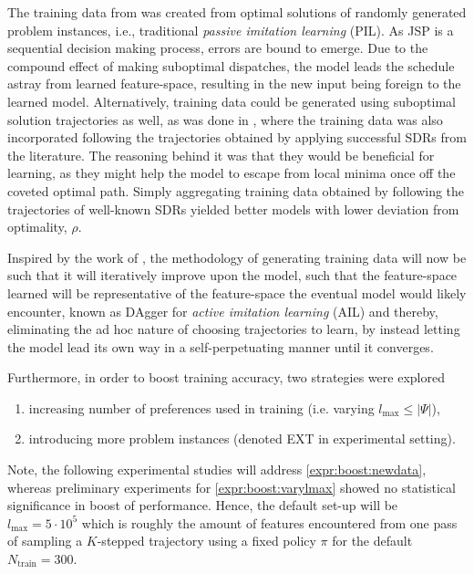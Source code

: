\documentclass[twocolumn]{svjour3}
\newcommand{\abs}[1]{\lvert#1\rvert}
\newcommand{\namerho}{deviation from optimality, $\rho$}
\begin{document}
The training data from \cite{InRu11a} was created from optimal solutions of 
randomly generated problem instances, i.e., traditional \emph{passive
imitation learning} (PIL). 
As JSP is a sequential decision making process, errors are bound to emerge. 
Due to the compound effect of making suboptimal dispatches, the model leads the 
schedule astray from learned feature-space, resulting in the new input being 
foreign to the learned model. 
Alternatively, training data could be generated using suboptimal solution 
trajectories as well, as was done in \cite{InRu15a}, where the training data 
was also incorporated following the trajectories obtained by applying 
successful SDRs from the literature. 
The reasoning behind it was that they would be beneficial for learning, 
as they might help the model to escape from local minima once off the coveted 
optimal path. 
Simply aggregating training data obtained by following the trajectories of 
well-known SDRs yielded better models with lower \namerho. 

Inspired by the work of \cite{RossB10,RossGB11}, the methodology of generating 
training data will now be such that it will iteratively improve upon the model, 
such that the feature-space learned will be representative of the feature-space 
the eventual model would likely encounter, known as DAgger for \emph{active 
imitation learning} (AIL) and thereby, eliminating the ad hoc nature of 
choosing trajectories to learn, by instead letting the model lead its own way 
in a self-perpetuating manner until it converges.

Furthermore, in order to boost training accuracy, two strategies were explored 
\begin{enumerate}[after={{}}, leftmargin=*,
label={\textbf{Boost.\arabic*}}, ref={{Boost.\arabic*}}]
\item \label{expr:boost:varylmax} increasing number of preferences used 
in training (i.e. varying \mbox{$l_{\max} \leq \abs{\Psi}$}),
\item \label{expr:boost:newdata} introducing more problem instances (denoted 
EXT in experimental setting).
\end{enumerate}
Note, the following experimental studies will address 
\ref{expr:boost:newdata}, whereas preliminary experiments for 
\ref{expr:boost:varylmax} showed no statistical significance in boost of 
performance. Hence, the default set-up will be $l_{\max}=5 \cdot 10^5$ which is 
roughly the amount of features encountered from one pass of sampling a 
\mbox{$K$-stepped} trajectory using a fixed policy $\pi$ for the default 
$N_{\text{train}}=300$. 
\end{document}
